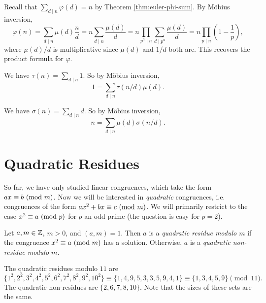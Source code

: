 \begin{example}
  Recall that $\sum_{d \mid n} \varphi(d) = n$ by
  Theorem \ref{thm:euler-phi-sum}.
  By M\"obius inversion,
  \[
    \varphi(n)
    = \sum_{d \mid n} \mu(d) \frac{n}{d}
    = n \sum_{d \mid n} \frac{\mu(d)}{d}
    = n \prod_{p^a \mid n} \sum_{d \mid p^a} \frac{\mu(d)}{d}
    = n \prod_{p \mid n} \left(1 - \frac{1}{p}\right),
  \]
  where $\mu(d) / d$ is multiplicative
  since $\mu(d)$ and $1 / d$ both are.
  This recovers the product formula
  for $\varphi$.
\end{example}

\begin{example}
  We have $\tau(n) = \sum_{d \mid n} 1$.
  So by M\"obius inversion,
  \[
    1 = \sum_{d \mid n} \tau(n / d) \mu(d).
  \]
\end{example}

\begin{example}
  We have $\sigma(n) = \sum_{d \mid n} d$.
  So by M\"obius inversion,
  \[
    n = \sum_{d \mid n} \mu(d) \sigma(n / d).
  \]
\end{example}

\section{Quadratic Residues}

\begin{remark}
  So far, we have only studied
  linear congruences, which take
  the form $ax \equiv b \ (\mathrm{mod}\ m)$.
  Now we will be interested in
  \emph{quadratic} congruences, i.e.
  congruences of the form
  $ax^2 + bx \equiv c \ (\mathrm{mod}\ m)$.
  We will primarily restrict to the
  case $x^2 \equiv a \ (\mathrm{mod}\ p)$
  for $p$ an odd prime (the question
  is easy for $p = 2$).
\end{remark}

\begin{definition}
  Let $a, m \in \mathbb{Z}$, $m > 0$, and
  $(a, m) = 1$. Then $a$ is
  a \emph{quadratic residue modulo $m$}
  if the congruence
  $x^2 \equiv a \ (\mathrm{mod}\ m)$ has a
  solution. Otherwise, $a$ is a
  \emph{quadratic non-residue modulo $m$}.
\end{definition}

\begin{example}
  The quadratic residues modulo $11$
  are
  \[
    \{
      1^2, 2^2, 3^2, 4^2, 5^2, 6^2, 7^2, 8^2, 9^2, 10^2
    \}
    \equiv \{1, 4, 9, 5, 3, 3, 5, 9, 4, 1\}
    \equiv \{1, 3, 4, 5, 9\} 
    \pmod{11}.
  \]
  The quadratic non-residues are
  $\{2, 6, 7, 8, 10\}$. Note that
  the sizes of these sets are the same.
\end{example}

